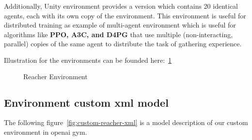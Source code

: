 Additionally, Unity environment provides a version which contains 20 identical agents, each with its own copy of the environment. This environment is useful for distributed training as example of multi-agent environment which is useful for algorithms like \textbf{PPO, A3C, and D4PG} that use multiple (non-interacting, parallel) copies of the same agent to distribute the task of gathering experience.

Illustration for the environments can be founded here:~\ref{fig:reacher-environment}

\begin{figure}%
    \centering
    \qquad
    \caption{Reacher Environment}%
    \label{fig:reacher-environment}%
\end{figure}

\clearpage

\subsection{Environment custom xml model}
The following figure~\ref{fig:custom-reacher-xml} is a model description of our custom environment in openai gym.

